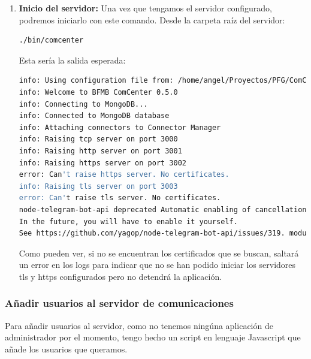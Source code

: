\documentclass[spanish,12pt, a4paper, twoside]{paper}
\begin{document}
\begin{enumerate}
\item\textbf{Inicio del servidor:} Una vez que tengamos el servidor configurado, podremos iniciarlo con este comando. Desde la carpeta raíz del servidor:
\begin{lstlisting}[language=sh]
./bin/comcenter
\end{lstlisting}

Esta sería la salida esperada:
\begin{lstlisting}[language=sh]
info: Using configuration file from: /home/angel/Proyectos/PFG/ComCenter/config.json
info: Welcome to BFMB ComCenter 0.5.0
info: Connecting to MongoDB...
info: Connected to MongoDB database
info: Attaching connectors to Connector Manager
info: Raising tcp server on port 3000
info: Raising http server on port 3001
info: Raising https server on port 3002
error: Can't raise https server. No certificates.
info: Raising tls server on port 3003
error: Can't raise tls server. No certificates.
node-telegram-bot-api deprecated Automatic enabling of cancellation of promises is deprecated.
In the future, you will have to enable it yourself.
See https://github.com/yagop/node-telegram-bot-api/issues/319. module.js:653:30
\end{lstlisting}

Como pueden ver, si no se encuentran los certificados que se buscan, saltará un error en los logs para indicar que no se han podido iniciar los servidores tls y https configurados pero no detendrá la aplicación.
\end{enumerate}

\subsubsection{Añadir usuarios al servidor de comunicaciones}

Para añadir usuarios al servidor, como no tenemos ningúna aplicación de administrador por el momento, tengo hecho un script en lenguaje Javascript que añade los usuarios que queramos.
\end{document}

